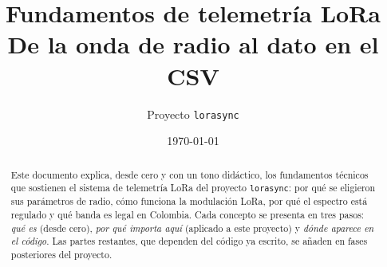 \documentclass[11pt,a4paper]{report}
\title{Fundamentos de telemetría LoRa\\[0.3em]
  \large De la onda de radio al dato en el CSV}
\author{Proyecto \texttt{lorasync}}
\date{\today}
\begin{document}
\maketitle

\begin{abstract}
\noindent
Este documento explica, desde cero y con un tono didáctico, los fundamentos técnicos que
sostienen el sistema de telemetría LoRa del proyecto \texttt{lorasync}: por qué se eligieron
sus parámetros de radio, cómo funciona la modulación LoRa, por qué el espectro está regulado
y qué banda es legal en Colombia. Cada concepto se presenta en tres pasos: \emph{qué es}
(desde cero), \emph{por qué importa aquí} (aplicado a este proyecto) y \emph{dónde aparece en
el código}. Las partes restantes, que dependen del código ya escrito, se añaden en fases
posteriores del proyecto.
\end{abstract}

\tableofcontents





% 
% 
% 
% 
% 
% 



\end{document}
